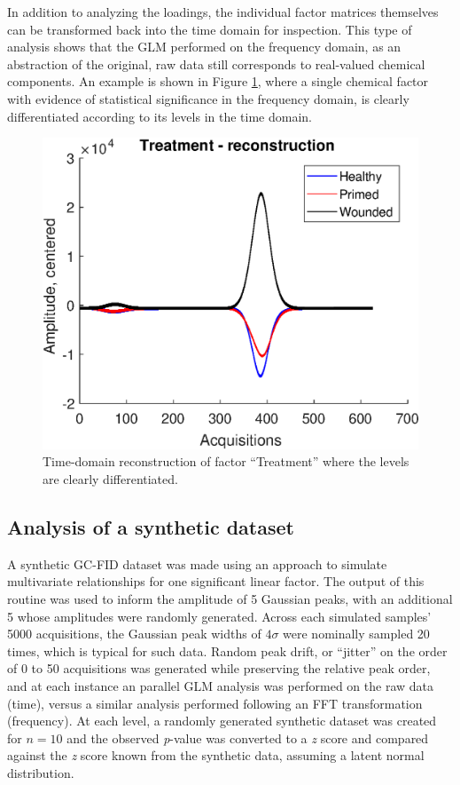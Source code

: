 \documentclass[preprint,12pt]{elsarticle}
\begin{document}
In addition to analyzing the loadings, the individual factor matrices themselves can be transformed back into the time domain for  inspection. This type of analysis shows that the GLM performed on the frequency domain, as an abstraction of the original, raw data still corresponds to real-valued chemical components. An example is shown in Figure \ref{fig:freq_treat}, where a single chemical factor with evidence of statistical significance in the frequency domain, is clearly differentiated according to its levels in the time domain.

\begin{figure}[hbt!]
    \centering
    \includegraphics[width=0.9\linewidth]{figures/time_treat.eps}
    \caption{Time-domain reconstruction of factor ``Treatment'' where the levels are clearly differentiated.}
    \label{fig:freq_treat}
\end{figure}

\subsection{Analysis of a synthetic dataset}

A synthetic GC-FID dataset was made using an approach to simulate multivariate relationships \cite{Camacho2016} for one significant linear factor. The output of this routine was used to inform the amplitude of 5 Gaussian peaks, with an additional 5 whose amplitudes were randomly generated. Across each simulated samples' 5000 acquisitions, the Gaussian peak widths of $4\sigma$ were nominally sampled 20 times, which is typical for such data. Random peak drift, or ``jitter'' on the order of 0 to 50 acquisitions was generated while preserving the relative peak order, and at each instance an parallel GLM analysis was performed on the raw data (time), versus a similar analysis performed following an FFT transformation (frequency). At each level, a randomly generated synthetic dataset was created for $n=10$ and the observed \textit{p}-value was converted to a \textit{z} score and compared against the \textit{z} score known from the synthetic data, assuming a latent normal distribution.
\end{document}
